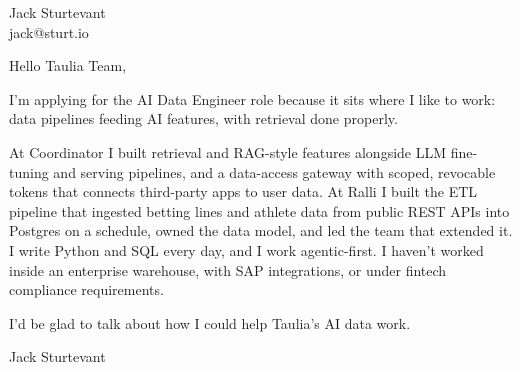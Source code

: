 \documentclass[11pt]{article}
\begin{document}
\raggedright

{\namefont\fontsize{20pt}{24pt}\selectfont Jack Sturtevant}\\[-0.3em]
jack@sturt.io

\vspace{1.2em}

Hello Taulia Team,

I'm applying for the AI Data Engineer role because it sits where I like to work: data pipelines feeding AI features, with retrieval done properly.

At Coordinator I built retrieval and RAG-style features alongside LLM fine-tuning and serving pipelines, and a data-access gateway with scoped, revocable tokens that connects third-party apps to user data. At Ralli I built the ETL pipeline that ingested betting lines and athlete data from public REST APIs into Postgres on a schedule, owned the data model, and led the team that extended it. I write Python and SQL every day, and I work agentic-first. I haven't worked inside an enterprise warehouse, with SAP integrations, or under fintech compliance requirements.

I'd be glad to talk about how I could help Taulia's AI data work.

\vspace{0.6em}
Jack Sturtevant
\end{document}
